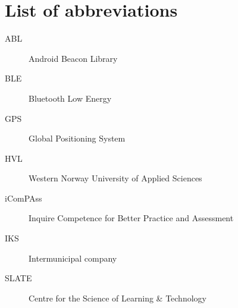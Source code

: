 \documentclass[../Main/thesis.tex]{subfiles}
\begin{document}
\chapter*{List of abbreviations}
\begin{description}
\item[ABL] Android Beacon Library
\item[BLE] Bluetooth Low Energy
\item[GPS] Global Positioning System
\item[HVL] Western Norway University of Applied Sciences
\item[iComPAss] Inquire Competence for Better Practice and Assessment
\item[IKS] Intermunicipal company
\item[SLATE] Centre for the Science of Learning \& Technology
\end{description}

\blankpage
\end{document}
